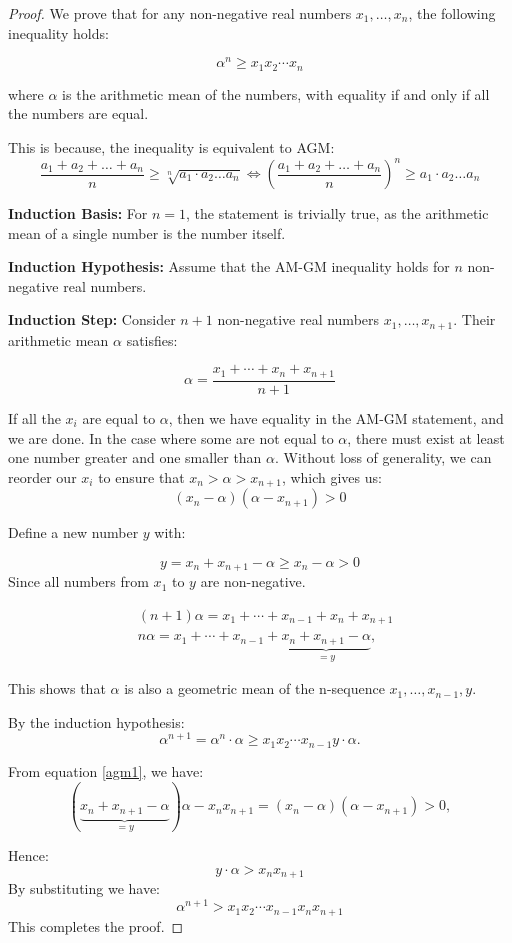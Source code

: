     \begin{proof}
        We prove that for any non-negative real numbers \(x_1, \ldots, x_n\), the following inequality holds:

\[
\alpha^n \geq x_1 x_2 \cdots x_n
\]

where \( \alpha \) is the arithmetic mean of the numbers, with equality if and only if all the numbers are equal.
\begin{remark}
    This is because, the inequality is equivalent to AGM:
    $$\frac{a_{1} +a_{2} +\dotsc +a_{n}}{n} \geq \sqrt[n]{a_{1} \cdot a_{2} \dotsc a_{n}} \Longleftrightarrow \left(\frac{a_{1} +a_{2} +\dotsc +a_{n}}{n}\right)^{n} \geq a_{1} \cdot a_{2} \dotsc a_{n}$$

\end{remark}
\textbf{Induction Basis:}
For \(n = 1\), the statement is trivially true, as the arithmetic mean of a single number is the number itself.

\noindent \textbf{Induction Hypothesis:}
Assume that the AM-GM inequality holds for \(n\) non-negative real numbers.

\noindent \textbf{Induction Step:}
Consider \(n+1\) non-negative real numbers \(x_1, \ldots, x_{n+1}\). Their arithmetic mean \( \alpha \) satisfies:

\[
\alpha = \frac{x_1 + \cdots + x_n + x_{n+1}}{n+1}
\]

If all the \(x_i\) are equal to \( \alpha \), then we have equality in the AM-GM statement, and we are done. In the case where some are not equal to \( \alpha \), there must exist at least one number greater and one smaller than \( \alpha \). Without loss of generality, we can reorder our \(x_i\) to ensure that \(x_n > \alpha > x_{n+1}\), which gives us:
\begin{equation}
    (x_n - \alpha)(\alpha - x_{n+1}) > 0 \label{agm1}
\end{equation}


Define a new number \( y \) with:

\[
y = x_n + x_{n+1} - \alpha \geq x_n - \alpha > 0
\]
Since all numbers from $x_1$ to $y$  are non-negative.

$$\begin{aligned}&(n+1)\alpha=x_1+\cdots+x_{n-1}+x_n+x_{n+1}\\&n\alpha=x_1+\cdots+x_{n-1}+\underbrace{x_n+x_{n+1}-\alpha}_{=y},\end{aligned}$$

This shows that $\alpha$ is also a geometric mean of the n-sequence $x_{1},\ldots,x_{n-1},y$. 

By the induction hypothesis:
$$\alpha^{n+1}=\alpha^n\cdot\alpha\geq x_1x_2\cdots x_{n-1}y\cdot\alpha.$$

From equation \autoref{agm1}, we have:
$$(\underbrace{x_n+x_{n+1}-\alpha}_{=y})\alpha-x_nx_{n+1}=(x_n-\alpha)(\alpha-x_{n+1})>0,$$

Hence:
$$y\cdot \alpha > x_n x_{n+1}$$
By substituting we have:
$$\alpha^{n+1}>x_1x_2\cdots x_{n-1}x_nx_{n+1}$$
This completes the proof.
\end{proof}

